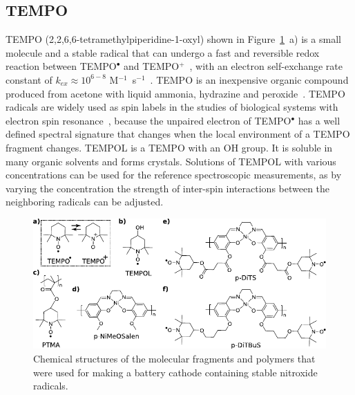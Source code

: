 \par
\subsection{TEMPO}
TEMPO (2,2,6,6-tetramethylpiperidine-1-oxyl) shown in Figure~\ref{fig:molecules}~a) is a small molecule and a stable radical that can undergo a fast and reversible redox reaction between TEMPO$^\bullet$ and TEMPO$^+$~\cite{Wang2019}, with an electron self-exchange rate constant of $k_{ex}\approx10^{6-8}$ M$^{-1}$~s$^{-1}$~\cite{Chatgilialoglu2012}. TEMPO is an inexpensive organic compound~\cite{Vereshchagin2022} produced from acetone with liquid ammonia, hydrazine and peroxide~\cite{Casado_2021_book}. TEMPO radicals are widely used as spin labels in the studies of biological systems with electron spin resonance~\cite{Bordignon2017}, because the unpaired electron of TEMPO$^\bullet$ has a well defined spectral signature that changes when the local environment of a TEMPO fragment changes. TEMPOL is a TEMPO with an OH group. It is soluble in many organic solvents and forms crystals. Solutions of TEMPOL with various concentrations can be used for the reference spectroscopic measurements, as by varying the concentration the strength of inter-spin interactions between the neighboring radicals can be adjusted.

\begin{figure}[h]
\center
	\includegraphics[width=1\textwidth]{./electrochemistry/figures/materials/molecules.pdf}
	\caption{Chemical structures of the molecular fragments and polymers that were used for making a battery cathode containing stable nitroxide radicals.}
	\label{fig:molecules}
\end{figure}



